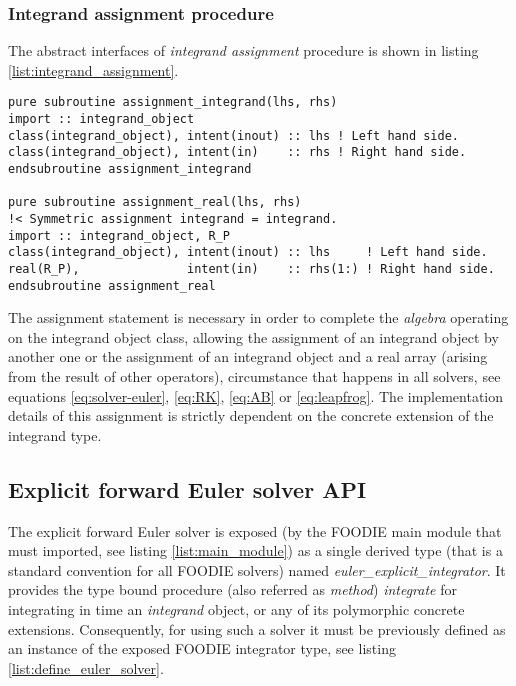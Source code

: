 \subsubsection{Integrand assignment procedure}

The abstract interfaces of \emph{integrand assignment} procedure is shown in listing \ref{list:integrand_assignment}.

\begin{lstlisting}[firstnumber=1,style=code,caption={integrand assignment procedure interface},label={list:integrand_assignment}]
pure subroutine assignment_integrand(lhs, rhs)
import :: integrand_object
class(integrand_object), intent(inout) :: lhs ! Left hand side.
class(integrand_object), intent(in)    :: rhs ! Right hand side.
endsubroutine assignment_integrand

pure subroutine assignment_real(lhs, rhs)
!< Symmetric assignment integrand = integrand.
import :: integrand_object, R_P
class(integrand_object), intent(inout) :: lhs     ! Left hand side.
real(R_P),               intent(in)    :: rhs(1:) ! Right hand side.
endsubroutine assignment_real
\end{lstlisting}

The assignment statement is necessary in order to complete the \emph{algebra} operating on the integrand object class, allowing the
assignment of an integrand object by another one or the assignment of an integrand object and a real array (arising from the result
of other operators), circumstance that happens in all solvers, see equations \ref{eq:solver-euler}, \ref{eq:RK}, \ref{eq:AB} or \ref{eq:leapfrog}. The implementation details of this assignment is strictly dependent on the concrete extension of the integrand type.

\clearpage

\subsection{Explicit forward Euler solver API}\label{subsec:solver_euler}

The explicit forward Euler solver is exposed (by the FOODIE main module that must imported, see listing \ref{list:main_module}) as a single derived type (that is a standard convention for all FOODIE solvers) named \emph{euler\_explicit\_integrator}. It provides the type bound procedure (also referred as \emph{method}) \emph{integrate} for integrating in time an \emph{integrand} object, or any of its polymorphic concrete extensions. Consequently, for using such a solver it must be previously defined as an instance of the exposed FOODIE integrator type, see listing \ref{list:define_euler_solver}.

